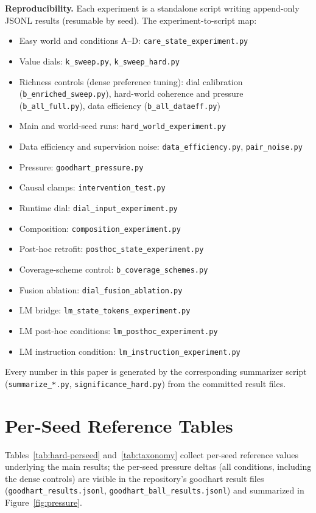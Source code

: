 \documentclass[manuscript, screen, review]{jair}
\begin{document}
\textbf{Reproducibility.} Each experiment is a standalone script writing append-only
JSONL results (resumable by seed). The experiment-to-script map:
\begin{itemize}
\item Easy world and conditions A--D: \texttt{care\_state\_experiment.py}
\item Value dials: \texttt{k\_sweep.py}, \texttt{k\_sweep\_hard.py}
\item Richness controls (dense preference tuning): dial calibration
  (\texttt{b\_enriched\_sweep.py}), hard-world coherence and pressure
  (\texttt{b\_all\_full.py}), data efficiency (\texttt{b\_all\_dataeff.py})
\item Main and world-seed runs: \texttt{hard\_world\_experiment.py}
\item Data efficiency and supervision noise: \texttt{data\_efficiency.py}, \texttt{pair\_noise.py}
\item Pressure: \texttt{goodhart\_pressure.py}
\item Causal clamps: \texttt{intervention\_test.py}
\item Runtime dial: \texttt{dial\_input\_experiment.py}
\item Composition: \texttt{composition\_experiment.py}
\item Post-hoc retrofit: \texttt{posthoc\_state\_experiment.py}
\item Coverage-scheme control: \texttt{b\_coverage\_schemes.py}
\item Fusion ablation: \texttt{dial\_fusion\_ablation.py}
\item LM bridge: \texttt{lm\_state\_tokens\_experiment.py}
\item LM post-hoc conditions: \texttt{lm\_posthoc\_experiment.py}
\item LM instruction condition: \texttt{lm\_instruction\_experiment.py}
\end{itemize}
Every number in this paper is generated by the corresponding summarizer script
(\texttt{summarize\_*.py}, \texttt{significance\_hard.py}) from the committed result files.

\section{Per-Seed Reference Tables}
\label{app:perseeds}

Tables~\ref{tab:hard-perseed} and~\ref{tab:taxonomy} collect per-seed reference values
underlying the main results; the per-seed pressure deltas (all conditions, including the dense
controls) are visible in the repository's goodhart result files
(\texttt{goodhart\_results.jsonl}, \texttt{goodhart\_ball\_results.jsonl}) and summarized
in Figure~\ref{fig:pressure}.
\end{document}
